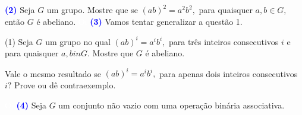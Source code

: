 \documentclass[12pt, a4paper]{article}
\newcommand{\negrito}[1]{\mbox{\boldmath{$#1$}}}
\begin{document}
\textcolor{blue}{\bf(2)}\label{2} Seja $G$ um grupo. Mostre que se $(ab)^2 = a^2b^2,$ para quaisquer $a,b \in G,$ então $G$ é abeliano.
\textcolor{white}{Oi}\newline\newline
\textcolor{blue}{\bf(3)}\label{3} Vamos tentar generalizar a questão 1.
\begin{tasks}[counter-format={(tsk[a])},label-width=3.6ex, label-format = {\bfseries}, column-sep = {0pt}](1)
\task[\textcolor{Floresta}{$\negrito{(a)} $}] Seja $G$ um grupo no qual $(ab)^i = a^ib^i,$ para três inteiros consecutivos $i$ e para quaisquer $a,b in G.$ Mostre que $G$ é abeliano.

\task[\textcolor{Floresta}{$\negrito{(b)} $}] Vale o mesmo resultado se $(ab)^i = a^ib^i,$ para apenas dois inteiros consecutivos $i?$ Prove ou dê contraexemplo.
\end{tasks}
\textcolor{white}{Oi}\newline\newline
\textcolor{blue}{\bf(4)}\label{4} Seja $G$ um conjunto não vazio com uma operação binária associativa. 
\end{document}
